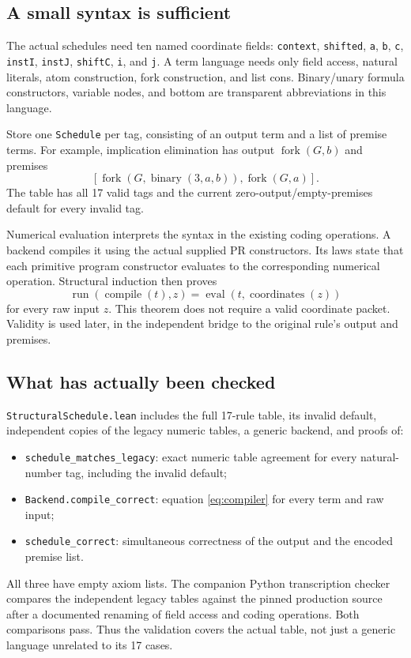\documentclass[11pt,a4paper]{article}
\newcommand{\code}[1]{\nolinkurl{#1}}
\begin{document}
\subsection{A small syntax is sufficient}

The actual schedules need ten named coordinate fields:
\code{context}, \code{shifted}, \code{a}, \code{b}, \code{c},
\code{instI}, \code{instJ}, \code{shiftC}, \code{i}, and \code{j}.
A term language needs only field access, natural literals, atom construction,
fork construction, and list cons. Binary/unary formula constructors, variable
nodes, and bottom are transparent abbreviations in this language.

Store one \code{Schedule} per tag, consisting of an output term and a list of
premise terms. For example, implication elimination has output
\(\operatorname{fork}(G,b)\) and premises
\[
 [\operatorname{fork}(G,\operatorname{binary}(3,a,b)),
   \operatorname{fork}(G,a)].
\]
The table has all 17 valid tags and the current zero-output/empty-premises
default for every invalid tag.

Numerical evaluation interprets the syntax in the existing coding operations.
A backend compiles it using the actual supplied PR constructors. Its laws
state that each primitive program constructor evaluates to the corresponding
numerical operation. Structural induction then proves
\begin{equation}
 \operatorname{run}(\operatorname{compile}(t),z)
 =\operatorname{eval}(t,\operatorname{coordinates}(z))
 \label{eq:compiler}
\end{equation}
for every raw input \(z\). This theorem does not require a valid coordinate
packet. Validity is used later, in the independent bridge to the original
rule's output and premises.

\subsection{What has actually been checked}

\code{StructuralSchedule.lean} includes the full 17-rule table, its invalid
default, independent copies of the legacy numeric tables, a generic backend,
and proofs of:
\begin{itemize}
\item \code{schedule_matches_legacy}: exact numeric table agreement for every
natural-number tag, including the invalid default;
\item \code{Backend.compile_correct}: equation \eqref{eq:compiler} for every
term and raw input;
\item \code{schedule_correct}: simultaneous correctness of the output and
the encoded premise list.
\end{itemize}
All three have empty axiom lists. The companion Python transcription checker
compares the independent legacy tables against the pinned production source
after a documented renaming of field access and coding operations. Both
comparisons pass. Thus the validation covers the actual table, not just a
generic language unrelated to its 17 cases.
\end{document}
